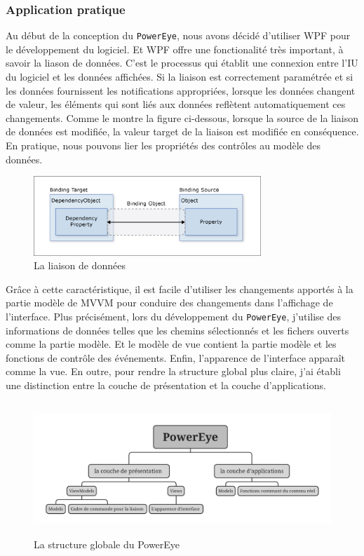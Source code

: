\subsubsection{Application pratique}
Au début de la conception du \texttt{PowerEye}, nous avons décidé d'utiliser \gls{WPF} pour le développement du logiciel. Et \gls{WPF} offre une fonctionalité très important, à savoir la liason de données. C'est le processus qui établit une connexion entre l’IU du logiciel et les données affichées. Si la liaison est correctement paramétrée et si les données fournissent les notifications appropriées, lorsque les données changent de valeur, les éléments qui sont liés aux données reflètent automatiquement ces changements. Comme le montre la figure ci-dessous, lorsque la source de la liaison de données est modifiée, la valeur target de la liaison est modifiée en conséquence. En pratique, nous pouvons lier les propriétés des contrôles au modèle des données.
\begin{figure}[H]
    \centering
    \includegraphics[height=3cm]{ressources/images/basic-data-binding-diagram.png}
    \caption{La liaison de données}
\end{figure}

Grâce à cette caractéristique, il est facile d'utiliser les changements apportés à la partie modèle de MVVM pour conduire des changements dans l'affichage de l'interface. Plus précisément, lors du développement du \texttt{PowerEye}, j'utilise des informations de données telles que les chemins sélectionnés et les fichers ouverts comme la partie modèle. Et le modèle de vue contient la partie modèle et les fonctions de contrôle des événements. Enfin, l'apparence de l'interface apparaît comme la vue. En outre, pour rendre la structure global plus claire, j'ai établi une distinction entre la couche de présentation et la couche d'applications.
\begin{figure}[H]
    \centering
    \includegraphics[height=5cm]{ressources/images/PowerEye_Structure.jpg}
    \caption{La structure globale du PowerEye}
\end{figure}

